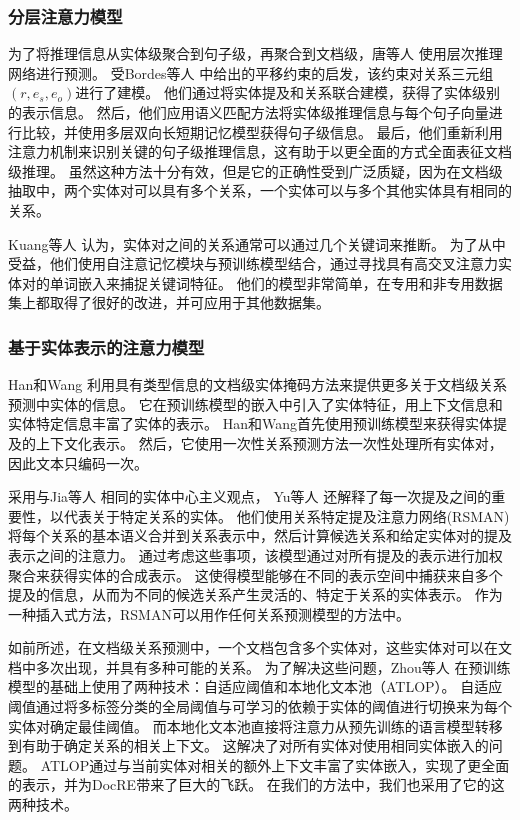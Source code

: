 \documentclass[bachelor]{thesis-uestc}
\begin{document}
\subsubsection{分层注意力模型}
为了将推理信息从实体级聚合到句子级，再聚合到文档级，唐等人 \cite{Tang2020HINHI}使用层次推理网络进行预测。
受Bordes等人 \cite{NIPS2013_1cecc7a7} 中给出的平移约束的启发，该约束对关系三元组$( r, e_s, e_o )$进行了建模。
他们通过将实体提及和关系联合建模，获得了实体级别的表示信息。
然后，他们应用语义匹配方法将实体级推理信息与每个句子向量进行比较，并使用多层双向长短期记忆模型获得句子级信息。
最后，他们重新利用注意力机制来识别关键的句子级推理信息，这有助于以更全面的方式全面表征文档级推理。
虽然这种方法十分有效，但是它的正确性受到广泛质疑，因为在文档级抽取中，两个实体对可以具有多个关系，一个实体可以与多个其他实体具有相同的关系。\par

Kuang等人 \cite{app12031599} 认为，实体对之间的关系通常可以通过几个关键词来推断。
为了从中受益，他们使用自注意记忆模块与预训练模型结合，通过寻找具有高交叉注意力实体对的单词嵌入来捕捉关键词特征。
他们的模型非常简单，在专用和非专用数据集上都取得了很好的改进，并可应用于其他数据集。

\subsubsection{基于实体表示的注意力模型}\label{subsec:entity-based-attention}

Han和Wang \cite{9098945}利用具有类型信息的文档级实体掩码方法来提供更多关于文档级关系预测中实体的信息。
它在预训练模型的嵌入中引入了实体特征，用上下文信息和实体特定信息丰富了实体的表示。
Han和Wang首先使用预训练模型来获得实体提及的上下文化表示。
然后，它使用一次性关系预测方法一次性处理所有实体对，因此文本只编码一次。\par

采用与Jia等人 \cite{jia-etal-2019-document}相同的实体中心主义观点， Yu等人 \cite{yu-etal-2022-relation} 还解释了每一次提及之间的重要性，以代表关于特定关系的实体。
他们使用关系特定提及注意力网络(RSMAN)将每个关系的基本语义合并到关系表示中，然后计算候选关系和给定实体对的提及表示之间的注意力。
通过考虑这些事项，该模型通过对所有提及的表示进行加权聚合来获得实体的合成表示。
这使得模型能够在不同的表示空间中捕获来自多个提及的信息，从而为不同的候选关系产生灵活的、特定于关系的实体表示。
作为一种插入式方法，RSMAN可以用作任何关系预测模型的方法中。\par

如前所述，在文档级关系预测中，一个文档包含多个实体对，这些实体对可以在文档中多次出现，并具有多种可能的关系。
为了解决这些问题，Zhou等人 \cite{Zhao2022DocumentlevelRE}在预训练模型的基础上使用了两种技术：自适应阈值和本地化文本池（ATLOP）。
自适应阈值通过将多标签分类的全局阈值与可学习的依赖于实体的阈值进行切换来为每个实体对确定最佳阈值。
而本地化文本池直接将注意力从预先训练的语言模型转移到有助于确定关系的相关上下文。
这解决了对所有实体对使用相同实体嵌入的问题。
ATLOP通过与当前实体对相关的额外上下文丰富了实体嵌入，实现了更全面的表示，并为DocRE带来了巨大的飞跃。
在我们的方法中，我们也采用了它的这两种技术。\par
\end{document}
